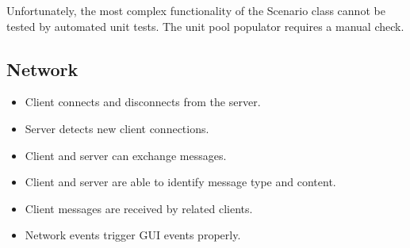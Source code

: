 {Unfortunately, the most complex functionality of the Scenario class 
cannot be tested by automated unit tests. The unit pool populator requires 
a manual check.

\subsection{Network}
\begin{itemize}
  \item Client connects and disconnects from the server.
  \item Server detects new client connections.
  \item Client and server can exchange messages.
  \item Client and server are able to identify message type and content.
  \item Client messages are received by related clients.
  \item Network events trigger GUI events properly.
\end{itemize}

}
